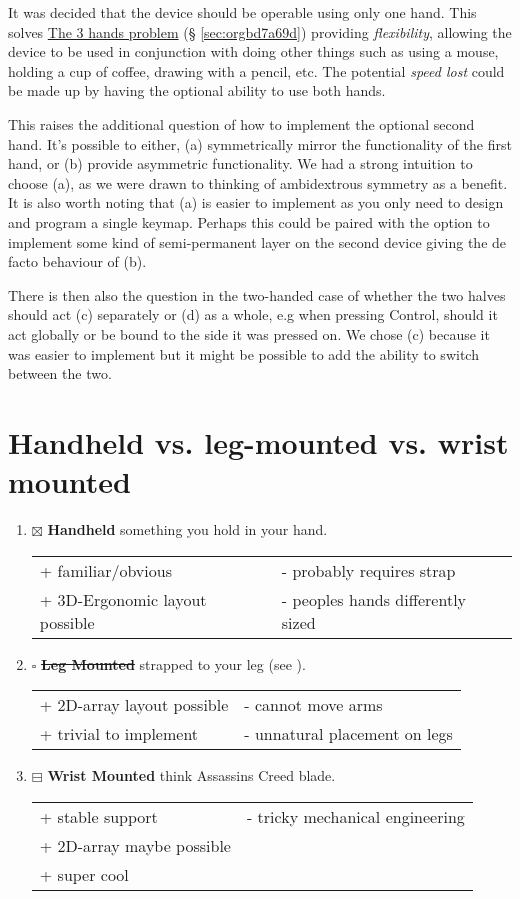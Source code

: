 \documentclass[logo,bsc,singlespacing,parskip]{infthesis}
\begin{document}
It was decided that the device should be operable using only one hand.
This solves \hyperref[sec:orgbd7a69d]{The 3 hands problem} (§ \ref{sec:orgbd7a69d}) providing \emph{flexibility}, allowing the device to be used in conjunction with doing other things such as using a mouse, holding a cup of coffee, drawing with a pencil, etc.
The potential \emph{speed lost} could be made up by having the optional ability to use both hands.

This raises the additional question of how to implement the optional second hand.
It's possible to either, (a) symmetrically mirror the functionality of the first hand, or (b) provide asymmetric functionality.
We had a strong intuition to choose (a), as we were drawn to thinking of ambidextrous symmetry as a benefit.
It is also worth noting that (a) is easier to implement as you only need to design and program a single keymap.
Perhaps this could be paired with the option to implement some kind of semi-permanent layer on the second device giving the de facto behaviour of (b).

There is then also the question in the two-handed case of whether the two halves should act (c) separately or (d) as a whole, e.g when pressing Control, should it act globally or be bound to the side it was pressed on.
We chose (c) because it was easier to implement but it might be possible to add the ability to switch between the two.
\section{Handheld vs. leg-mounted vs. wrist mounted}
\label{sec:orgda7472c}
\begin{enumerate}
\item{$\boxtimes$} \textbf{Handheld} something you hold in your hand.
\begin{longtable}{|p{6.25cm}|p{6.25cm}|}
\hline
+ familiar/obvious & - probably requires strap\\
+ 3D-Ergonomic layout possible & - peoples hands differently sized\\
\hline
\end{longtable}
\item{$\square$} \sout{\textbf{Leg Mounted}} strapped to your leg (see \autocite{SimulaVR2021}).
\begin{longtable}{|p{6.25cm}|p{6.25cm}|}
\hline
+ 2D-array layout possible & - cannot move arms\\
+ trivial to implement & - unnatural placement on legs\\
\hline
\end{longtable}
\item{$\boxminus$} \textbf{Wrist Mounted} think Assassins Creed blade.
\begin{longtable}{|p{6.25cm}|p{6.25cm}|}
\hline
+ stable support & - tricky mechanical engineering\\
+ 2D-array maybe possible & \\
+ super cool & \\
\hline
\end{longtable}
\end{enumerate}
\end{document}
